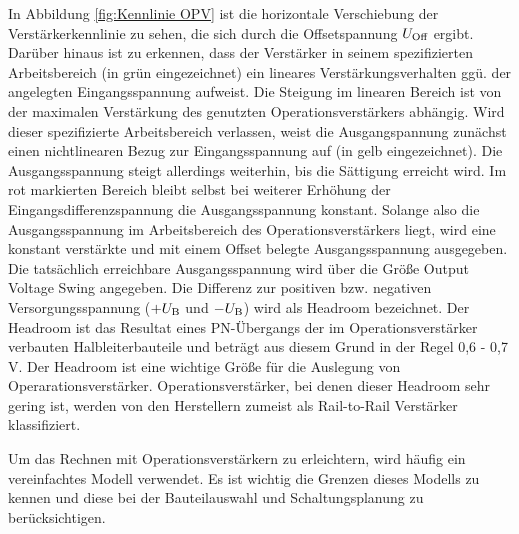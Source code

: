 \begin{frame}
{        In Abbildung \ref{fig:Kennlinie OPV} ist die horizontale Verschiebung der Verstärkerkennlinie zu sehen, die sich durch die Offsetspannung $U_{\textnormal{Off}}$ ergibt.
        Darüber hinaus ist zu erkennen, dass der Verstärker in seinem spezifizierten Arbeitsbereich (in grün eingezeichnet) ein lineares Verstärkungsverhalten ggü. der angelegten Eingangsspannung aufweist.
        Die Steigung im linearen Bereich ist von der maximalen Verstärkung des genutzten Operationsverstärkers abhängig.
        Wird dieser spezifizierte Arbeitsbereich verlassen, weist die Ausgangspannung zunächst einen nichtlinearen Bezug zur Eingangsspannung auf (in gelb eingezeichnet). Die Ausgangsspannung steigt allerdings weiterhin, bis die Sättigung  erreicht wird.
        Im rot markierten Bereich bleibt selbst bei weiterer Erhöhung der Eingangsdifferenzspannung die Ausgangsspannung konstant.
        Solange also die Ausgangsspannung im Arbeitsbereich des Operationsverstärkers liegt, wird eine konstant verstärkte und mit einem Offset belegte Ausgangsspannung ausgegeben.
        Die tatsächlich erreichbare Ausgangsspannung wird über die Größe \glqq Output Voltage Swing\grqq{} angegeben.
        Die Differenz zur positiven bzw. negativen Versorgungsspannung ($+U_{\textnormal{B}}$ und $-U_{\textnormal{B}}$) wird als \glqq Headroom\grqq{} bezeichnet.
        Der Headroom ist das Resultat eines PN-Übergangs der im Operationsverstärker verbauten Halbleiterbauteile und beträgt aus diesem Grund in der Regel 0,6 - 0,7 V.
        Der Headroom ist eine wichtige Größe für die Auslegung von Operarationsverstärker.
        Operationsverstärker, bei denen dieser Headroom sehr gering ist, werden von den Herstellern zumeist als \glqq Rail-to-Rail\grqq{} Verstärker klassifiziert.
        
        \begin{Merksatz}{}
            Um das Rechnen mit Operationsverstärkern zu erleichtern, wird häufig ein vereinfachtes Modell verwendet.
            Es ist wichtig die Grenzen dieses Modells zu kennen und diese bei der Bauteilauswahl und Schaltungsplanung zu berücksichtigen.
        \end{Merksatz}
    }



\end{frame}
